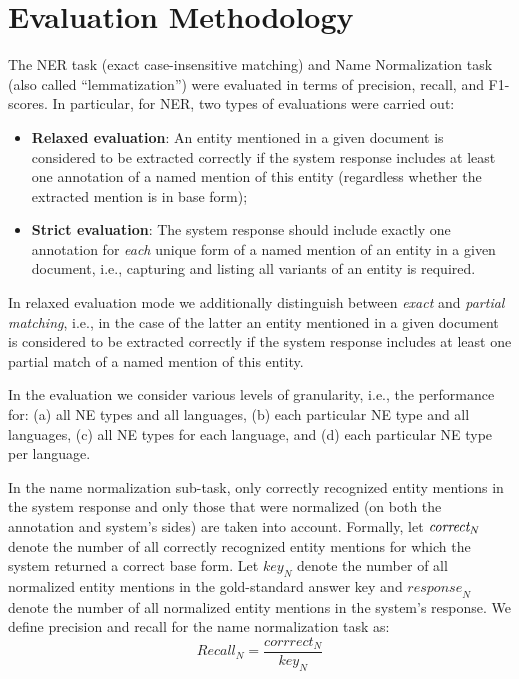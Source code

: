 \documentclass[11pt]{article}
\begin{document}
\begin{table*}[t]
\begin{minipage}{\linewidth}
  \end{minipage}%
\end{table*}



\section{Evaluation Methodology}
\label{sec:evaluation}

The NER task (exact case-insensitive matching) and Name Normalization task (also called
``lemmatization'') were evaluated in terms of precision, recall, and F1-scores.  In
particular, for NER, two types of evaluations were carried out:

\begin{itemize}

\item \textbf{Relaxed evaluation}: An entity mentioned in a given document is considered to be
  extracted correctly if the system response includes at least one annotation of a named
  mention of this entity (regardless whether the extracted mention is in base form);

\item \textbf{Strict evaluation}: The system response should include exactly one annotation
  for {\em each} unique form of a named mention of an entity in a given document, i.e.,
  capturing and listing all variants of an entity is required.

\end{itemize}

\noindent In relaxed evaluation mode we additionally distinguish between \textit{exact} and
\textit{partial matching}, i.e., in the case of the latter an entity mentioned in a given
document is considered to be extracted correctly if the system response includes at least one
partial match of a named mention of this entity.

In the evaluation we consider various levels of granularity, i.e., the performance for: (a) all
NE types and all languages, (b) each particular NE type and all languages, (c) all NE types
for each language, and (d) each particular NE type per language.


In the name normalization sub-task, only correctly recognized entity mentions in the system
response and only those that were normalized (on both the annotation and system's sides) are
taken into account.  Formally, let $\emph{correct}_{N}$ denote the number of all correctly recognized
entity mentions for which the system returned a correct base form.  Let $\mathit{key}_{N}$ denote the
number of all normalized entity mentions in the gold-standard answer key and $\mathit{response}_{N}$
denote the number of all normalized entity mentions in the system's response. We define
precision and recall for the name normalization task as:
%
\begin{equation*}
	\mathit{Recall_{N}} = \frac{\mathit{corrrect}_{N}}{\mathit{key}_{N}}              
\end{equation*}
\end{document}
